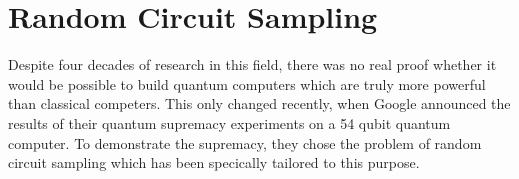 \chapter{Random Circuit Sampling}

Despite four decades
of research in this field, 
there was no real proof whether it would be possible to build quantum computers
which are truly more powerful than classical competers. This only changed
recently, when Google announced the results of their quantum supremacy
experiments on a 54 qubit quantum computer. To demonstrate the supremacy, they
chose the problem of random circuit sampling which has been specically tailored
to this purpose.